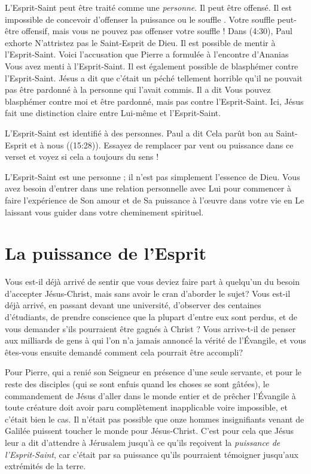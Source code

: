 L'Esprit-Saint peut être traité comme une \emph{personne}. Il peut être offensé.
 Il est impossible de concevoir d'offenser \Og la puissance \Fg{} ou
 \Og le souffle \Fg{}. Votre souffle peut-être offensif, mais vous ne pouvez
 pas offenser votre souffle ! Dans (4:30), Paul exhorte\frcolon{}
 \Og N'attristez pas le Saint-Esprit de Dieu. \Fg{}
 Il est possible de mentir à l'Esprit-Saint. Voici l'accusation que Pierre a
 formulée à l'encontre d'Ananias\frcolon{}
 \Og Vous avez menti à l'Esprit-Saint. \Fg{}
 Il est également possible de blasphémer contre l'Esprit-Saint.
 Jésus a dit que c'était un péché tellement horrible qu'il ne pouvait pas
 être pardonné à la personne qui l'avait commis. Il a dit\frcolon{}
 \Og Vous pouvez blasphémer contre moi et être pardonné, mais pas contre
 l'Esprit-Saint. \Fg{}
 Ici, Jésus fait une distinction claire entre Lui-même et l'Esprit-Saint.

L'Esprit-Saint est identifié à des personnes. Paul a dit\frcolon{}
 \Og Cela parût bon au Saint-Esprit et à nous \Fg{}
 ((15:28)).
 Essayez de remplacer par vent ou puissance dans ce verset et voyez si cela
 a toujours du sens !

L'Esprit-Saint est une personne ; il n'est pas simplement l'essence de Dieu.
 Vous avez besoin d'entrer dans une relation personnelle avec Lui pour
 commencer à faire l'expérience de Son amour et de Sa puissance à l'œuvre
 dans votre vie en Le laissant vous guider dans votre cheminement spirituel.


\section{La puissance de l'Esprit}

Vous est-il déjà arrivé de sentir que vous deviez faire part à quelqu'un
 du besoin d'accepter Jésus-Christ, mais sans avoir le cran d'aborder le sujet?
 Vous est-il déjà arrivé, en passant devant une université,
 d'observer des centaines d'étudiants, de prendre conscience que la plupart d'entre eux sont perdus,
 et de vous demander s'ils pourraient être gagnés à Christ ?
 Vous arrive-t-il de penser aux milliards de gens à qui l'on n'a jamais
 annoncé la vérité de l'Évangile, et vous êtes-vous ensuite demandé
 comment cela pourrait être accompli?

Pour Pierre, qui a renié son Seigneur en présence d'une seule servante,
 et pour le reste des disciples (qui se sont enfuis quand les choses se sont gâtées),
 le commandement de Jésus d'aller dans le monde entier et de prêcher
 l'Évangile à toute créature doit avoir paru complètement inapplicable voire
 impossible, et c'était bien le cas.
 Il n'était pas possible que onze hommes insignifiants venant de Galilée
 puissent toucher le monde pour Jésus-Christ.
 C'est pour cela que Jésus leur a dit d'attendre à Jérusalem jusqu'à ce
 qu'ils reçoivent la \emph{puissance de l'Esprit-Saint}, car c'était par
 sa puissance qu'ils pourraient témoigner jusqu'aux extrémités de la terre.


